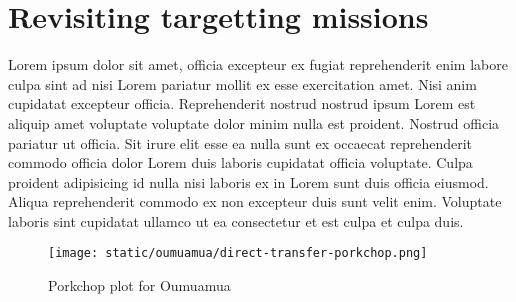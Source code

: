 \chapter{Revisiting targetting missions}

Lorem ipsum dolor sit amet, officia excepteur ex fugiat reprehenderit enim
labore culpa sint ad nisi Lorem pariatur mollit ex esse exercitation amet. Nisi
anim cupidatat excepteur officia. Reprehenderit nostrud nostrud ipsum Lorem est
aliquip amet voluptate voluptate dolor minim nulla est proident. Nostrud officia
pariatur ut officia. Sit irure elit esse ea nulla sunt ex occaecat reprehenderit
commodo officia dolor Lorem duis laboris cupidatat officia voluptate. Culpa
proident adipisicing id nulla nisi laboris ex in Lorem sunt duis officia
eiusmod. Aliqua reprehenderit commodo ex non excepteur duis sunt velit enim.
Voluptate laboris sint cupidatat ullamco ut ea consectetur et est culpa et culpa
duis.

\newpage
\begin{figure}[H]
  \centering
  \texttt{[image: static/oumuamua/direct-transfer-porkchop.png]}
  \caption{Porkchop plot for Oumuamua}
  \label{fig:porkchop}
\end{figure}
